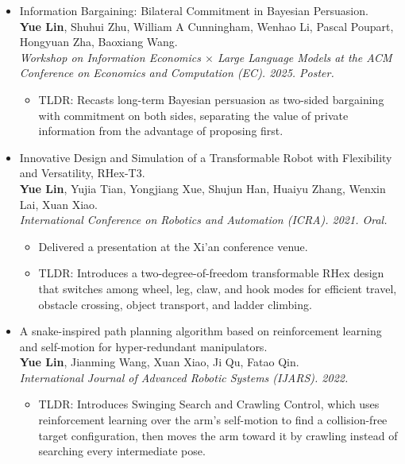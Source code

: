 \documentclass[a4paper,20pt]{article}
\begin{document}
\begin{itemize}[leftmargin=*,itemsep=0pt,topsep=0pt,partopsep=0pt]
\begin{itemize}[itemsep=0pt,topsep=0pt,partopsep=0pt]
            \item TLDR: Introduces ALIGN, a decentralized mechanism in which self-interested language-model agents exchange open-ended, tone-graded gossip to build reputations, coordinate social norms, and isolate defectors.
      \end{itemize}
\item Information Bargaining: Bilateral Commitment in Bayesian Persuasion. \\
      \textbf{Yue Lin}, Shuhui Zhu, William A Cunningham, Wenhao Li, Pascal Poupart, Hongyuan Zha, Baoxiang Wang. \\
      \textit{Workshop on Information Economics $\times$ Large Language Models at the ACM Conference on Economics and Computation (EC). 2025. Poster.}
      \begin{itemize}[itemsep=0pt,topsep=0pt,partopsep=0pt]

            \item TLDR: Recasts long-term Bayesian persuasion as two-sided bargaining with commitment on both sides, separating the value of private information from the advantage of proposing first.
      \end{itemize}
\item Innovative Design and Simulation of a Transformable Robot with Flexibility and Versatility, RHex-T3. \\
      \textbf{Yue Lin}, Yujia Tian, Yongjiang Xue, Shujun Han, Huaiyu Zhang, Wenxin Lai, Xuan Xiao. \\
      \textit{International Conference on Robotics and Automation (ICRA). 2021. Oral.}
      \begin{itemize}[itemsep=0pt,topsep=0pt,partopsep=0pt]
        \item Delivered a presentation at the Xi’an conference venue.

        \item TLDR: Introduces a two-degree-of-freedom transformable RHex design that switches among wheel, leg, claw, and hook modes for efficient travel, obstacle crossing, object transport, and ladder climbing.
      \end{itemize}
\item A snake-inspired path planning algorithm based on reinforcement learning and self-motion for hyper-redundant manipulators. \\
      \textbf{Yue Lin}, Jianming Wang, Xuan Xiao, Ji Qu, Fatao Qin. \\
      \textit{International Journal of Advanced Robotic Systems (IJARS). 2022.}
      \begin{itemize}[itemsep=0pt,topsep=0pt,partopsep=0pt]

            \item TLDR: Introduces Swinging Search and Crawling Control, which uses reinforcement learning over the arm's self-motion to find a collision-free target configuration, then moves the arm toward it by crawling instead of searching every intermediate pose.
      \end{itemize}

\end{itemize}
\end{document}

